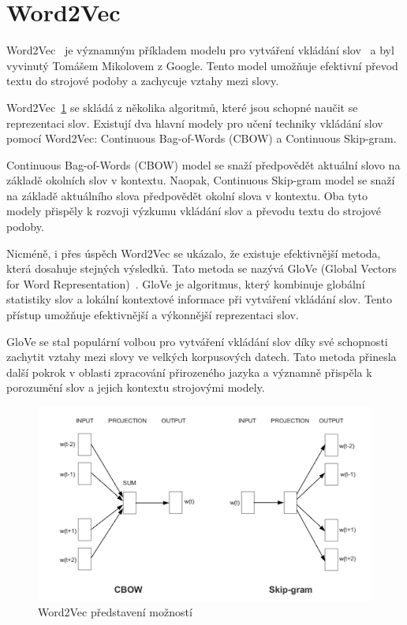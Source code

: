 \section{Word2Vec}
Word2Vec~\cite{link6} je významným příkladem modelu pro vytváření vkládání slov~\cite{link5} a byl vyvinutý Tomášem Mikolovem z Google. Tento model umožňuje efektivní převod textu do strojové podoby a zachycuje vztahy mezi slovy.

Word2Vec~\ref{fig:Word2Vec predstaveni moznosti} se skládá z několika algoritmů, které jsou schopné naučit se reprezentaci slov. Existují dva hlavní modely pro učení techniky vkládání slov pomocí Word2Vec: Continuous Bag-of-Words (CBOW) a Continuous Skip-gram.

Continuous Bag-of-Words (CBOW) model se snaží předpovědět aktuální slovo na základě okolních slov v kontextu. Naopak, Continuous Skip-gram model se snaží na základě aktuálního slova předpovědět okolní slova v kontextu. Oba tyto modely přispěly k rozvoji výzkumu vkládání slov a převodu textu do strojové podoby.

Nicméně, i přes úspěch Word2Vec se ukázalo, že existuje efektivnější metoda, která dosahuje stejných výsledků. Tato metoda se nazývá GloVe (Global Vectors for Word Representation)~\cite{link18}. GloVe je algoritmus, který kombinuje globální statistiky slov a lokální kontextové informace při vytváření vkládání slov. Tento přístup umožňuje efektivnější a výkonnější reprezentaci slov.

GloVe se stal populární volbou pro vytváření vkládání slov díky své schopnosti zachytit vztahy mezi slovy ve velkých korpusových datech. Tato metoda přinesla další pokrok v oblasti zpracování přirozeného jazyka a významně přispěla k porozumění slov a jejich kontextu strojovými modely.

\begin{figure}[H]
	\centering
	\includegraphics[width=1\textwidth]{Figures/word2vec_diagrams.png}
	\caption{Word2Vec představení možností~\cite{link6}}\label{fig:Word2Vec predstaveni moznosti}
\end{figure}

